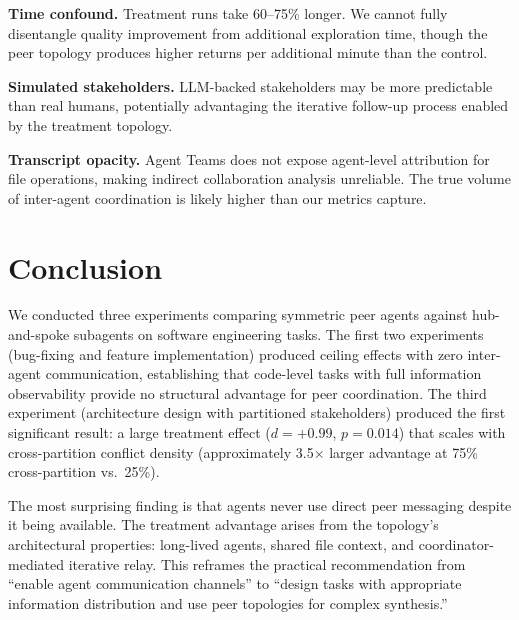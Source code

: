 \documentclass[11pt,letterpaper]{article}
\newcommand{\pval}[1]{\ensuremath{p = #1}}
\newcommand{\deff}[1]{\ensuremath{d = #1}}
\begin{document}
\textbf{Time confound.} Treatment runs take 60--75\% longer. We
cannot fully disentangle quality improvement from additional
exploration time, though the peer topology produces higher returns
per additional minute than the control.

\textbf{Simulated stakeholders.} LLM-backed stakeholders may be more
predictable than real humans, potentially advantaging the iterative
follow-up process enabled by the treatment topology.

\textbf{Transcript opacity.} Agent Teams does not expose agent-level
attribution for file operations, making indirect collaboration
analysis unreliable. The true volume of inter-agent coordination
is likely higher than our metrics capture.


\section{Conclusion}
\label{sec:conclusion}

We conducted three experiments comparing symmetric peer agents against
hub-and-spoke subagents on software engineering tasks. The first two
experiments (bug-fixing and feature implementation) produced ceiling
effects with zero inter-agent communication, establishing that
code-level tasks with full information observability provide no
structural advantage for peer coordination. The third experiment
(architecture design with partitioned stakeholders) produced the
first significant result: a large treatment effect (\deff{+0.99},
\pval{0.014}) that scales with cross-partition conflict density
(approximately 3.5$\times$ larger advantage at 75\% cross-partition vs.\ 25\%).

The most surprising finding is that agents never use direct peer
messaging despite it being available. The treatment advantage arises
from the topology's architectural properties: long-lived agents,
shared file context, and coordinator-mediated iterative relay. This
reframes the practical recommendation from ``enable agent communication
channels'' to ``design tasks with appropriate information distribution
and use peer topologies for complex synthesis.''
\end{document}
